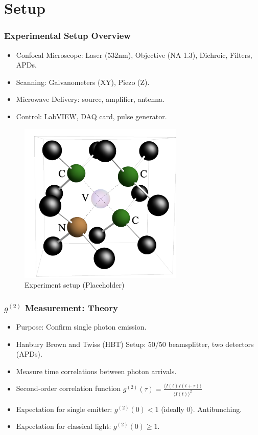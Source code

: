 \documentclass{beamer}
\begin{document}
\section{Setup}

\begin{frame}
\frametitle{Experimental Setup Overview}
\begin{itemize}
    \item Confocal Microscope: Laser (532nm), Objective (NA 1.3), Dichroic, Filters, APDs.
    \item Scanning: Galvanometers (XY), Piezo (Z).
    \item Microwave Delivery: source, amplifier, antenna. 
    \item Control: LabVIEW, DAQ card, pulse generator. 
\end{itemize}
\begin{figure}
    \includegraphics[width=0.7\textwidth]{figs/lattice.png} %
    \caption{Experiment setup (Placeholder)}
    \end{figure}
\end{frame}


\begin{frame}
\frametitle{$g^{(2)}$ Measurement: Theory}
\begin{itemize}
    \item Purpose: Confirm single photon emission.
    \item Hanbury Brown and Twiss (HBT) Setup: 50/50 beamsplitter, two detectors (APDs).
    \item Measure time correlations between photon arrivals.
    \item Second-order correlation function $g^{(2)}(\tau) = \frac{\langle I(t)I(t+\tau) \rangle}{\langle I(t) \rangle^2}$
    \item Expectation for single emitter: $g^{(2)}(0) < 1$ (ideally 0). Antibunching.
    \item Expectation for classical light: $g^{(2)}(0) \ge 1$.
\end{itemize}
\end{frame}
\end{document}
